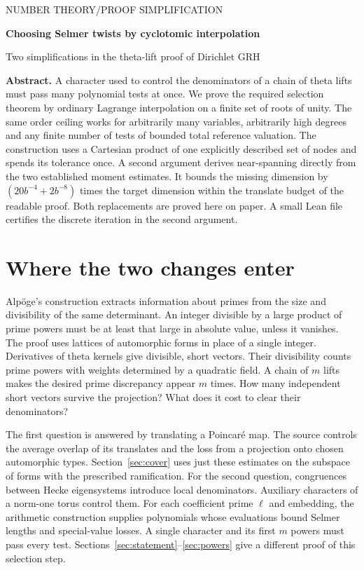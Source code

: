 \documentclass[11pt]{article}
\begin{document}
\thispagestyle{plain}
{\small\color{ink}\sffamily NUMBER THEORY\quad /\quad PROOF SIMPLIFICATION}\par\vspace{7pt}
{\LARGE\bfseries Choosing Selmer twists by cyclotomic interpolation}\par
{\large Two simplifications in the theta-lift proof of Dirichlet GRH}\par
\vspace{4pt}{\small November 27, 2026}\par\vspace{4pt}
\textbf{Abstract.} A character used to control the denominators of a chain of theta lifts must pass many polynomial tests at once. We prove the required selection theorem by ordinary Lagrange interpolation on a finite set of roots of unity. The same order ceiling works for arbitrarily many variables, arbitrarily high degrees and any finite number of tests of bounded total reference valuation. The construction uses a Cartesian product of one explicitly described set of nodes and spends its tolerance once. A second argument derives near-spanning directly from the two established moment estimates. It bounds the missing dimension by $(20b^{-4}+2b^{-8})$ times the target dimension within the translate budget of the readable proof. Both replacements are proved here on paper. A small Lean file certifies the discrete iteration in the second argument.
\section{Where the two changes enter}
Alp\"oge's construction extracts information about primes from the size and divisibility of the same determinant. An integer divisible by a large product of prime powers must be at least that large in absolute value, unless it vanishes. The proof uses lattices of automorphic forms in place of a single integer. Derivatives of theta kernels give divisible, short vectors. Their divisibility counts prime powers with weights determined by a quadratic field. A chain of $m$ lifts makes the desired prime discrepancy appear $m$ times. How many independent short vectors survive the projection? What does it cost to clear their denominators?

The first question is answered by translating a Poincar\'e map. The source controls the average overlap of its translates and the loss from a projection onto chosen automorphic types. Section~\ref{sec:cover} uses just these estimates on the subspace of forms with the prescribed ramification. For the second question, congruences between Hecke eigensystems introduce local denominators. Auxiliary characters of a norm-one torus control them. For each coefficient prime $\ell$ and embedding, the arithmetic construction supplies polynomials whose evaluations bound Selmer lengths and special-value losses. A single character and its first $m$ powers must pass every test. Sections~\ref{sec:statement}--\ref{sec:powers} give a different proof of this selection step.
\end{document}
